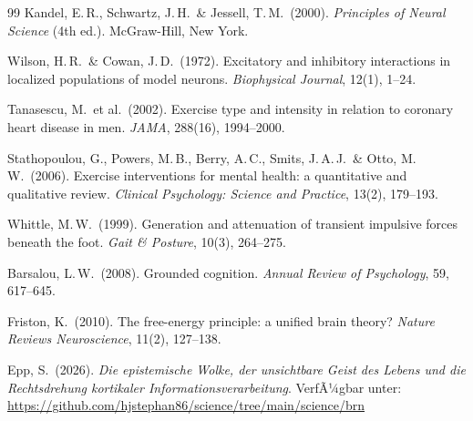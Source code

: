 ﻿\documentclass[12pt,a4paper]{report}
\theoremstyle{plain}
\theoremstyle{definition}
\theoremstyle{remark}
\begin{document}
\begin{thebibliography}{99}
Kandel, E.\,R., Schwartz, J.\,H.\ \& Jessell, T.\,M.\ (2000).
\textit{Principles of Neural Science} (4th ed.).
McGraw-Hill, New York.

Wilson, H.\,R.\ \& Cowan, J.\,D.\ (1972).
Excitatory and inhibitory interactions in localized populations of model neurons.
\textit{Biophysical Journal}, 12(1), 1--24.

Tanasescu, M.\ et al.\ (2002).
Exercise type and intensity in relation to coronary heart disease in men.
\textit{JAMA}, 288(16), 1994--2000.

Stathopoulou, G., Powers, M.\,B., Berry, A.\,C., Smits, J.\,A.\,J.\
\& Otto, M.\,W.\ (2006).
Exercise interventions for mental health: a quantitative and qualitative review.
\textit{Clinical Psychology: Science and Practice}, 13(2), 179--193.

Whittle, M.\,W.\ (1999).
Generation and attenuation of transient impulsive forces beneath the foot.
\textit{Gait \& Posture}, 10(3), 264--275.

Barsalou, L.\,W.\ (2008).
Grounded cognition.
\textit{Annual Review of Psychology}, 59, 617--645.

Friston, K.\ (2010).
The free-energy principle: a unified brain theory?
\textit{Nature Reviews Neuroscience}, 11(2), 127--138.

Epp, S.\ (2026).
\textit{Die epistemische Wolke, der unsichtbare Geist des Lebens
und die Rechtsdrehung kortikaler Informationsverarbeitung}.
VerfÃ¼gbar unter: \url{https://github.com/hjstephan86/science/tree/main/science/brn}

\end{thebibliography}
\end{document}
